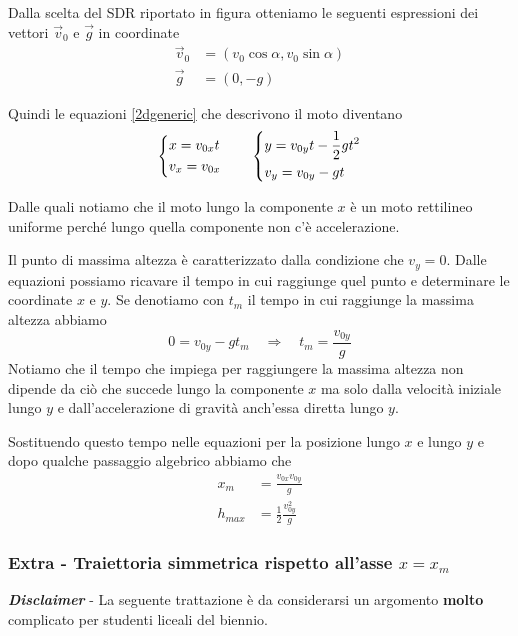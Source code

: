 \documentclass{article}
\begin{document}
Dalla scelta del SDR riportato in figura otteniamo le seguenti espressioni dei vettori $\Vec{v}_0$ e $\Vec{g}$ in coordinate
\begin{align}
  \Vec{v}_0 &= (v_0 \cos \alpha, v_0 \sin \alpha)\\
  \Vec{g} &= (0, -g)
\end{align}

Quindi le equazioni \ref{2dgeneric} che descrivono il moto diventano
\begin{equation}
  \begin{dcases}
    x = v_{0x} t \\
    v_x = v_{0x}
  \end{dcases}
  \qquad
  \begin{dcases}
    y = v_{0y} t - \frac{1}{2}gt^2 \\
    v_y = v_{0y} - gt
  \end{dcases}
\end{equation}

Dalle quali notiamo che il moto lungo la componente $x$ è un moto rettilineo uniforme perché lungo quella componente non c'è accelerazione.

Il punto di massima altezza è caratterizzato dalla condizione che $v_y =0$. Dalle equazioni possiamo ricavare il tempo in cui raggiunge quel punto e determinare le coordinate $x$ e $y$.
Se denotiamo con $t_m$ il tempo in cui raggiunge la massima altezza abbiamo
\begin{equation}
  0 = v_{0y} -gt_m \quad\Rightarrow\quad t_m = \frac{v_{0y}}{g}
\end{equation}
Notiamo che il tempo che impiega per raggiungere la massima altezza non dipende da ciò che succede lungo la componente $x$ ma solo dalla velocità iniziale lungo $y$ e dall'accelerazione di gravità anch'essa diretta lungo $y$.

Sostituendo questo tempo nelle equazioni per la posizione lungo $x$ e lungo $y$ e dopo qualche passaggio algebrico abbiamo che
\begin{align}
  x_m &= \frac{v_{0x}v_{0y}}{g} \\
  h_{max} &= \frac{1}{2}\frac{v_{0y}^2}{g}
\end{align}

\subsubsection{Extra - Traiettoria simmetrica rispetto all'asse $x=x_m$}
\textbf{\textit{Disclaimer}} - La seguente trattazione è da considerarsi un argomento \textbf{molto} complicato per studenti liceali del biennio.
\vspace{10pt}
\end{document}
